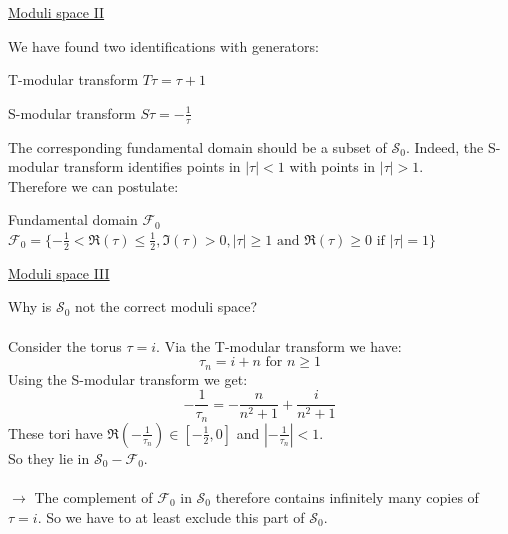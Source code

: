 \documentclass[11pt,aspectratio=169]{beamer}
\begin{document}
\begin{frame}{\underline{Moduli space II}}

	We have found two identifications with generators:
	\begin{block}{T-modular transform}
		$T\tau = \tau + 1$
	\end{block}
	\begin{block}{S-modular transform}
		$S\tau = -\frac{1}{\tau}$
	\end{block}
	The corresponding fundamental domain should be a subset of $\mathcal{S}_{0}$. Indeed, the S-modular transform identifies points in $|\tau| < 1$ with points in $|\tau| > 1$.
	\\
	Therefore we can postulate:
	\begin{block}{Fundamental domain $\mathcal{F}_{0}$}
		$\mathcal{F}_{0} = \{-\frac{1}{2} < \Re(\tau) \leq \frac{1}{2}, \Im(\tau) > 0, |\tau| \geq 1 \textrm{ and } \Re(\tau) \geq 0 \textrm{ if } |\tau| = 1\}$
	\end{block}
	
\end{frame}

\begin{frame}{\underline{Moduli space III}}

	Why is $\mathcal{S}_0$ not the correct moduli space?
	\\~\\
	Consider the torus $\tau = i$. Via the T-modular transform we have:
	\begin{equation}
		\tau_n = i + n \textrm{ for } n \geq 1
	\end{equation}
	Using the S-modular transform we get:
	\begin{equation}
		-\frac{1}{\tau_n} = -\frac{n}{n^2 + 1} + \frac{i}{n^2 + 1}
	\end{equation}
	These tori have $\Re(-\frac{1}{\tau_n}) \in [-\frac{1}{2}, 0]$ and $|-\frac{1}{\tau_n}| < 1$. 
	\\
	So they lie in $\mathcal{S}_0 - \mathcal{F}_0$.
	\\~\\
	$\rightarrow$ The complement of $\mathcal{F}_0$ in $\mathcal{S}_0$ therefore contains infinitely many copies of $\tau = i$. So we have to at least exclude this part of $\mathcal{S}_0$.
	
\end{frame}
\end{document}
